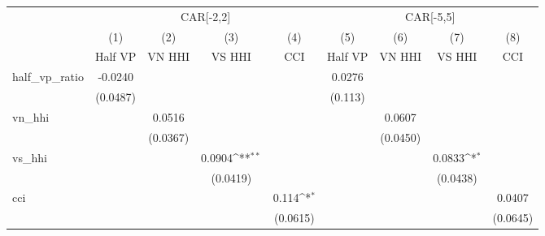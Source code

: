 {
\def\sym#1{\ifmmode^{#1}\else\(^{#1}\)\fi}
\begin{tabular}{l*{8}{c}}
\hline\hline
                    &\multicolumn{4}{c}{CAR[-2,2]}                                                          &\multicolumn{4}{c}{CAR[-5,5]}                                                          \\
                    &\multicolumn{1}{c}{(1)}&\multicolumn{1}{c}{(2)}&\multicolumn{1}{c}{(3)}&\multicolumn{1}{c}{(4)}&\multicolumn{1}{c}{(5)}&\multicolumn{1}{c}{(6)}&\multicolumn{1}{c}{(7)}&\multicolumn{1}{c}{(8)}\\
                    &\multicolumn{1}{c}{Half VP}&\multicolumn{1}{c}{VN HHI}&\multicolumn{1}{c}{VS HHI}&\multicolumn{1}{c}{CCI}&\multicolumn{1}{c}{Half VP}&\multicolumn{1}{c}{VN HHI}&\multicolumn{1}{c}{VS HHI}&\multicolumn{1}{c}{CCI}\\
\hline
half\_vp\_ratio       &     -0.0240         &                     &                     &                     &      0.0276         &                     &                     &                     \\
                    &    (0.0487)         &                     &                     &                     &     (0.113)         &                     &                     &                     \\
vn\_hhi              &                     &      0.0516         &                     &                     &                     &      0.0607         &                     &                     \\
                    &                     &    (0.0367)         &                     &                     &                     &    (0.0450)         &                     &                     \\
vs\_hhi              &                     &                     &      0.0904\sym{**} &                     &                     &                     &      0.0833\sym{*}  &                     \\
                    &                     &                     &    (0.0419)         &                     &                     &                     &    (0.0438)         &                     \\
cci                 &                     &                     &                     &       0.114\sym{*}  &                     &                     &                     &      0.0407         \\
                    &                     &                     &                     &    (0.0615)         &                     &                     &                     &    (0.0645)         \\

\end{tabular}}
